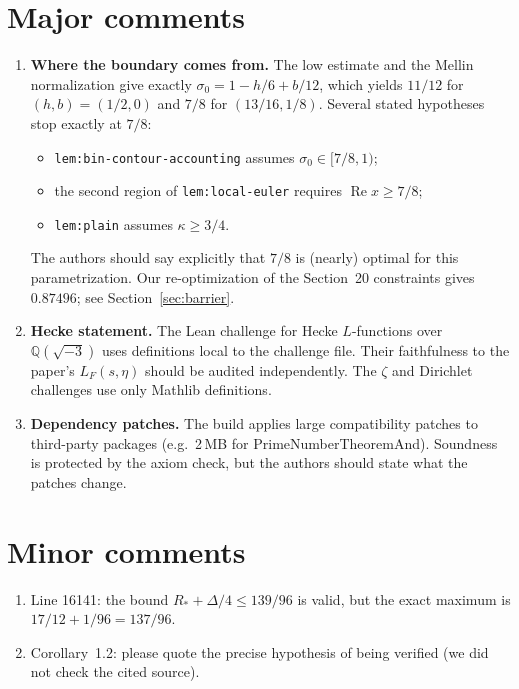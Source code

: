 \documentclass[11pt,a4paper]{article}
\renewcommand{\Re}{\operatorname{Re}}
\begin{document}
\section{Major comments}
\begin{enumerate}
\item \textbf{Where the boundary comes from.} The low estimate and the Mellin normalization give exactly
  $\sigma_0=1-h/6+b/12$, which yields $11/12$ for $(h,b)=(1/2,0)$ and $7/8$ for $(13/16,1/8)$. Several stated
  hypotheses stop exactly at $7/8$:
  \begin{itemize}
  \item \texttt{lem:bin-contour-accounting} assumes $\sigma_0\in[7/8,1)$;
  \item the second region of \texttt{lem:local-euler} requires $\Re x\ge7/8$;
  \item \texttt{lem:plain} assumes $\kappa\ge3/4$.
  \end{itemize}
  The authors should say explicitly that $7/8$ is (nearly) optimal for this parametrization. Our re-optimization
  of the Section~20 constraints gives $0.87496$; see Section~\ref{sec:barrier}.
\item \textbf{Hecke statement.} The Lean challenge for Hecke $L$-functions over $\mathbb Q(\sqrt{-3})$ uses
  definitions local to the challenge file. Their faithfulness to the paper's $L_F(s,\eta)$ should be audited
  independently. The $\zeta$ and Dirichlet challenges use only Mathlib definitions.
\item \textbf{Dependency patches.} The build applies large compatibility patches to third-party packages
  (e.g.\ 2\,MB for PrimeNumberTheoremAnd). Soundness is protected by the axiom check, but the authors should
  state what the patches change.
\end{enumerate}

\section{Minor comments}
\begin{enumerate}
\item Line 16141: the bound $R_*+\Delta/4\le139/96$ is valid, but the exact maximum is $17/12+1/96=137/96$.
\item Corollary~1.2: please quote the precise hypothesis of \cite[Conj.~6.3, Thm.~6.7]{BIMS} being verified
  (we did not check the cited source).
\end{enumerate}
\end{document}
